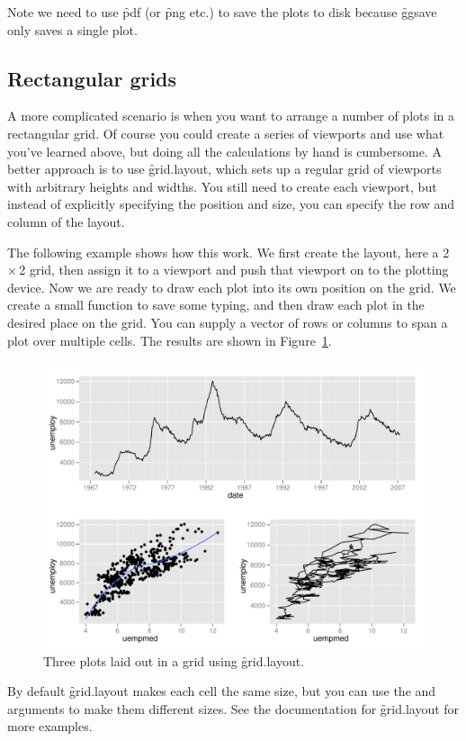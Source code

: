 Note we need to use \f{pdf} (or \f{png} etc.) to save the plots to disk because \f{ggsave} only saves a single plot.

\subsection{Rectangular grids} 

A more complicated scenario is when you want to arrange a number of plots in a rectangular grid. Of course you could create a series of viewports and use what you've learned above, but doing all the calculations by hand is cumbersome. A better approach is to use \f{grid.layout}, which sets up a regular grid of viewports with arbitrary heights and widths. You still need to create each viewport, but instead of explicitly specifying the position and size, you can specify the row and column of the layout.

The following example shows how this work.  We first create the layout, here a 2\,$\times$\,2 grid, then assign it to a viewport and push that viewport on to the plotting device.  Now we are ready to draw each plot into its own position on the grid.  We create a small function to save some typing, and then draw each plot in the desired place on the grid.  You can supply a vector of rows or columns to span a plot over multiple cells.  The results are shown in Figure~\ref{fig:layout-2}.

% 
% 


\begin{figure}[htbp]
  \centering
    \includegraphics[width=\linewidth]{polishing-layout}
  \caption{Three plots laid out in a grid using \f{grid.layout}.}
  \label{fig:layout-2}
\end{figure}

By default \f{grid.layout} makes each cell the same size, but you can use the  and  arguments to make them different sizes.  See the documentation for \f{grid.layout} for more examples.


